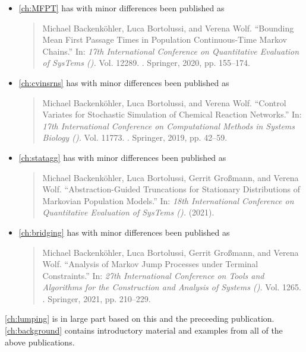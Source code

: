 \begin{itemize}

\item \autoref{ch:MFPT} has with minor differences been published as
\begin{quote}
	Michael Backenköhler, Luca Bortolussi, and Verena
Wolf. ``Bounding Mean First Passage Times in
	Population Con\-tin\-uo\-us-Time Markov Chains.'' In: \emph{17th
International Conference on Quantitative Evaluation of
    SysTems ().} Vol. 12289. . Springer, 2020,
pp. 155--174.
\end{quote}

\item \autoref{ch:cvinsrns} has with minor differences been published as
\begin{quote}
	Michael Backenköhler, Luca Bortolussi, and Verena
Wolf. ``Control Variates for Stochastic Simulation of
	Chemical Reaction Networks.'' In: \emph{17th International
    Conference on Computational Methods in Systems Biology ().} Vol. 11773. . Springer, 2019,
pp. 42--59.
\end{quote}

\item \autoref{ch:statagg} has with minor differences been published as
\begin{quote}
	Michael Backenköhler, Luca Bortolussi, Gerrit Großmann, and Verena Wolf. ``Abstracti\-on-Guid\-ed Truncations
for Stationary Distributions of Markovian
	Population Models.'' In: \emph{18th
International Conference on Quantitative Evaluation of
    SysTems ().} (2021).
\end{quote}

	\item \autoref{ch:bridging} has with minor differences been published as

\begin{quote}
	Michael Backenköhler, Luca Bortolussi, Gerrit Großmann, and Verena Wolf.
	``Analysis of Markov Jump Processes under Terminal Constraints.''
	In: \emph{27th International Conference on Tools and Algorithms for
    the Construction and Analysis of Systems ().}  Vol. 1265. .
	Springer, 2021, pp. 210--229.
\end{quote}
\end{itemize}
\autoref{ch:lumping} is in large part based on this and the preceeding publication.
\autoref{ch:background} contains introductory material and examples from all of the above publications.


% 


